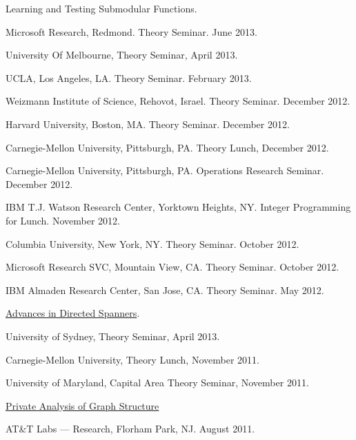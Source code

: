 \documentclass[11pt]{article}
\newenvironment{innerlist}[1][\enskip\textbullet]%
        {\begin{compactitem}[#1]}{\end{compactitem}}
\begin{document}
\begin{innerlist}
\item Learning and Testing Submodular Functions.
\begin{innerlist}
  \item Microsoft Research, Redmond. Theory Seminar. June 2013.
  \item University Of Melbourne, Theory Seminar, April 2013.
  \item UCLA, Los Angeles, LA. Theory Seminar. February 2013.
  \item Weizmann Institute of Science, Rehovot, Israel. Theory Seminar. December 2012.  
  \item Harvard University, Boston, MA. Theory Seminar. December 2012.
  \item Carnegie-Mellon University, Pittsburgh, PA. Theory Lunch, December 2012.
  \item Carnegie-Mellon University, Pittsburgh, PA. Operations Research Seminar. December 2012.
  \item IBM T.J. Watson Research Center, Yorktown Heights, NY. Integer Programming for Lunch. November 2012.
  \item Columbia University, New York, NY. Theory Seminar. October 2012.
  \item Microsoft Research SVC, Mountain View, CA. Theory Seminar. October 2012.
  \item IBM Almaden Research Center, San Jose, CA. Theory Seminar. May 2012.
\end{innerlist}

\item \href{http://grigory.us/files/talks/AdvancesInDirectedSpanners.pdf}{Advances in Directed Spanners}.
\begin{innerlist}
\item University of Sydney, Theory Seminar, April 2013.
\item Carnegie-Mellon University, Theory Lunch, November 2011.
\item University of Maryland, Capital Area Theory Seminar, November 2011.
\end{innerlist}

\item \href{http://grigory.us/files/talks/KRSY-VLDB11.pptx}{Private Analysis of Graph Structure}
\begin{innerlist}
  \item AT\&T Labs --- Research, Florham Park, NJ. August 2011.
\end{innerlist}

\begin{comment}
\item Introduction to Property Testing
\begin{innerlist}
\item St. Petersburg Department of V.A. Steklov Institute of Mathematics of the Russian Academy of Sciences. December 2012.
\item St. Petersburg Institute of Fine Mechanics and Optics. Theory Seminar. December 2012.
\end{innerlist}


\end{comment}
\end{innerlist}
\end{document}
